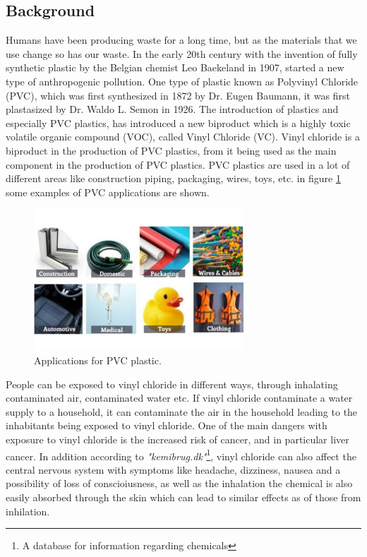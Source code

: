 \documentclass{article}
\begin{document}
\subsection{Background}
Humans have been producing waste for a long time, but as the materials that we use change so has our waste.
In the early 20th century with the invention of fully synthetic plastic by the Belgian chemist Leo Baekeland in 1907\cite{plastic_history}, started a new type of anthropogenic pollution.
One type of plastic known as Polyvinyl Chloride (PVC), which was first synthesized in 1872 by Dr. Eugen Baumann\cite{pvc_origin}, it was first plastasized by Dr. Waldo L. Semon in 1926\cite{history_pvc}.
The introduction of plastics and especially PVC plastics, has introduced a new biproduct which is a highly toxic volatile organic compound (VOC), called Vinyl Chloride (VC).
Vinyl chloride is a biproduct in the production of PVC plastics, from it being used as the main component in the production of PVC plastics.
PVC plastics are used in a lot of different areas like construction piping, packaging, wires, toys, etc. in figure \ref{fig:pvc_applications} some examples of PVC applications are shown.

\begin{figure}[H]
    \centering
    \includegraphics[width=0.7\textwidth]{pvc_applications.jpg}
    \caption{Applications for PVC plastic. \cite{pvc_applications_euroeplas}}
    \label{fig:pvc_applications}
\end{figure}

People can be exposed to vinyl chloride in different ways, through inhalating contaminated air, contaminated water etc.
If vinyl chloride contaminate a water supply to a household, it can contaminate the air in the household leading to the inhabitants being exposed to vinyl chloride. \cite{vc_cancer}
One of the main dangers with exposure to vinyl chloride is the increased risk of cancer, and in particular liver cancer.\cite{vc_cancer}
In addition according to \textit{"kemibrug.dk"}\footnote{A database for information regarding chemicals}, vinyl chloride can also affect the central nervous system with symptoms like headache, dizziness, nausea and a possibility of loss of conscioiusness, as well as the inhalation the chemical is also easily absorbed through the skin which can lead to similar effects as of those from inhilation.\cite{vc_kemibrug}\\
\end{document}
